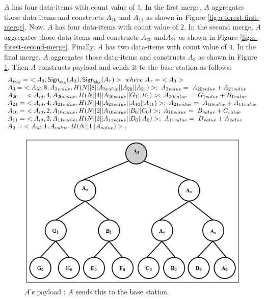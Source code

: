 	$A$ has four data-items with count value of $1$.
	In the first merge, $A$ aggregates those data-items and constructs $A_{10}$ and $A_{11}$ as shown in Figure \ref{fig:a-forest-first-merge}.
	Now, $A$ has four data-items with count value of $2$.
	In the second merge, $A$ aggregates those data-items and constructs $A_{20}$ and$A_{21}$ as shown in Figure \ref{fig:a-forest-second-merge}.
	Finally, $A$ has two data-items with count value of $4$.
	In the final merge, $A$ aggregates those data-items and constructs $A_{3}$ as shown in Figure \ref{fig:a-payload}.
	Then $A$ constructs payload and sends it to the base station as follows:
		\begin{equation*}
			\begin{array}{l}
				A_{pay} =\ <A_{3},\textsf{Sign}_{\sk_{A}}(A_{3}),\textsf{Sign}_{\sk_{A}}(A_{\tau})>\ where\ A_{\tau} =\ <A_{3}>\\
				A_{3} =\ <A_{id}, 8, A_{3value}, H(N||8||A_{3value}||A_{20}||A_{21})>;\ A_{3value} =\ A_{20value} + A_{21value}\\
				A_{20} =\ <A_{id},4,A_{20value},H(N||4||A_{20value}||G_{1}||B_{1})>;\ A_{20value} =\ G_{1value} + B_{1value}\\ 
				A_{21} =\ <A_{id},4,A_{21value},H(N||4||A_{21value}||A_{10}||A_{11})>;\ A_{21value} =\ A_{10value} + A_{11value}\\ 
				A_{10} =\ <A_{id},2,A_{10value},H(N||2||A_{10value}||B_{0}||C_{0})>;\ A_{10value} =\ B_{value} + C_{value}\\
				A_{11} =\ <A_{id},2,A_{11value},H(N||2||A_{11value}||D_{0}||A_{0})>;\ A_{11value} =\ D_{value} + A_{value}\\
				A_{0} =\ <A_{id},1,A_{value},H(N||1||A_{value})>.
			\end{array}
		\end{equation*}
	\begin{figure}[h!]
		\centering
		\includegraphics{images/a-payload.png}
		\caption{$A$'s payload : $A$ sends this to the base station.}
		\label{fig:a-payload}
	\end{figure}

